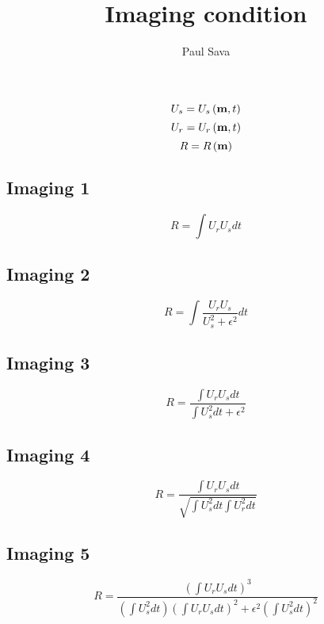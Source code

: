 \title{Imaging condition}
\author{Paul Sava}

\def\mt{\left( {\bf m},t \right)}
\def\mm{\left( {\bf m}   \right)}
\def\Us{U_s}
\def\Ur{U_r}
\def\R {R  }

\[\Us = \Us\mt \]
\[\Ur = \Ur\mt \]
\[\R  = \R \mm \]

\subsection{Imaging 1}
\[ \R = \int \Ur \Us dt \]

\subsection{Imaging 2}
\[ \R = \int \frac{\Ur \Us}{\Us^2 + \epsilon^2} dt \]

\subsection{Imaging 3}
\[ \R = \frac{\int \Ur \Us dt}{\int \Us^2 dt + \epsilon^2} \]

\subsection{Imaging 4}
\[ \R = \frac{\int \Ur \Us dt}
                {\sqrt{\int \Us^2 dt \int \Ur^2 dt}} \]

\subsection{Imaging 5}
\[ \R = \frac{                             \left( \int \Ur \Us   dt \right)^3}
             {\left( \int \Us^2 dt \right) \left( \int \Ur \Us   dt \right)^2 +
              \epsilon^2                   \left( \int     \Us^2 dt \right)^2}
\]

